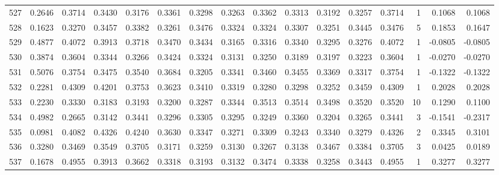 \begin{tabular}{lrrrrrrrrrrrrrrr}
527 &      0.2646 &  0.3714 &  0.3430 &  0.3176 &  0.3361 &  0.3298 &  0.3263 &  0.3362 &  0.3313 &  0.3192 &   0.3257 &     0.3714 &      1 &                    0.1068 &                     0.1068 \\
528 &      0.1623 &  0.3270 &  0.3457 &  0.3382 &  0.3261 &  0.3476 &  0.3324 &  0.3324 &  0.3307 &  0.3251 &   0.3445 &     0.3476 &      5 &                    0.1853 &                     0.1647 \\
529 &      0.4877 &  0.4072 &  0.3913 &  0.3718 &  0.3470 &  0.3434 &  0.3165 &  0.3316 &  0.3340 &  0.3295 &   0.3276 &     0.4072 &      1 &                   -0.0805 &                    -0.0805 \\
530 &      0.3874 &  0.3604 &  0.3344 &  0.3266 &  0.3424 &  0.3324 &  0.3131 &  0.3250 &  0.3189 &  0.3197 &   0.3223 &     0.3604 &      1 &                   -0.0270 &                    -0.0270 \\
531 &      0.5076 &  0.3754 &  0.3475 &  0.3540 &  0.3684 &  0.3205 &  0.3341 &  0.3460 &  0.3455 &  0.3369 &   0.3317 &     0.3754 &      1 &                   -0.1322 &                    -0.1322 \\
532 &      0.2281 &  0.4309 &  0.4201 &  0.3753 &  0.3623 &  0.3410 &  0.3319 &  0.3280 &  0.3298 &  0.3252 &   0.3459 &     0.4309 &      1 &                    0.2028 &                     0.2028 \\
533 &      0.2230 &  0.3330 &  0.3183 &  0.3193 &  0.3200 &  0.3287 &  0.3344 &  0.3513 &  0.3514 &  0.3498 &   0.3520 &     0.3520 &     10 &                    0.1290 &                     0.1100 \\
534 &      0.4982 &  0.2665 &  0.3142 &  0.3441 &  0.3296 &  0.3305 &  0.3295 &  0.3249 &  0.3360 &  0.3204 &   0.3265 &     0.3441 &      3 &                   -0.1541 &                    -0.2317 \\
535 &      0.0981 &  0.4082 &  0.4326 &  0.4240 &  0.3630 &  0.3347 &  0.3271 &  0.3309 &  0.3243 &  0.3340 &   0.3279 &     0.4326 &      2 &                    0.3345 &                     0.3101 \\
536 &      0.3280 &  0.3469 &  0.3549 &  0.3705 &  0.3171 &  0.3259 &  0.3130 &  0.3267 &  0.3138 &  0.3467 &   0.3384 &     0.3705 &      3 &                    0.0425 &                     0.0189 \\
537 &      0.1678 &  0.4955 &  0.3913 &  0.3662 &  0.3318 &  0.3193 &  0.3132 &  0.3474 &  0.3338 &  0.3258 &   0.3443 &     0.4955 &      1 &                    0.3277 &                     0.3277 \\

\end{tabular}

